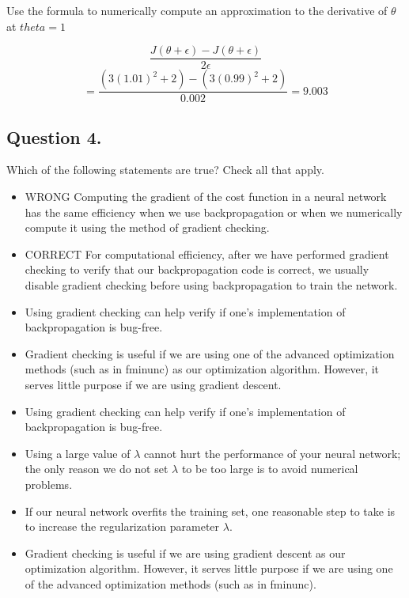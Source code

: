 \documentclass[11pt]{article} %
\begin{document}
Use the formula to numerically compute an approximation to the derivative of $\theta$
at $theta = 1$

\[
\frac{J(\theta + \epsilon) - J(\theta + \epsilon)}{2\epsilon} 
\]
\[
= \frac{(3(1.01)^2 + 2) - (3(0.99)^2 + 2)}{0.002} 
= 9.003
\]
\subsection*{ Question 4. }
Which of the following statements are true? Check all that apply.

\begin{itemize}
	\item WRONG Computing the gradient of the cost function in a neural network has the same efficiency when we use backpropagation or when we numerically compute it using the method of gradient checking.
	
	\item CORRECT For computational efficiency, after we have performed gradient checking to verify that our backpropagation code is correct, we usually disable gradient checking before using backpropagation to train the network.
	
	\item Using gradient checking can help verify if one's implementation of backpropagation is bug-free.
	
	\item Gradient checking is useful if we are using one of the advanced optimization methods (such as in fminunc) as our optimization algorithm. However, it serves little purpose if we are using gradient descent.
	
	\item Using gradient checking can help verify if one's implementation of backpropagation is bug-free.
	
	\item Using a large value of $\lambda$ cannot hurt the performance of your neural network; the only reason we do not set $\lambda$ to be too large is to avoid numerical problems.
	
	\item If our neural network overfits the training set, one reasonable step to take is to increase the regularization parameter $\lambda$.
	
	\item Gradient checking is useful if we are using gradient descent as our optimization algorithm. However, it serves little purpose if we are using one of the advanced optimization methods (such as in fminunc).
	
\end{itemize}
\end{document}
